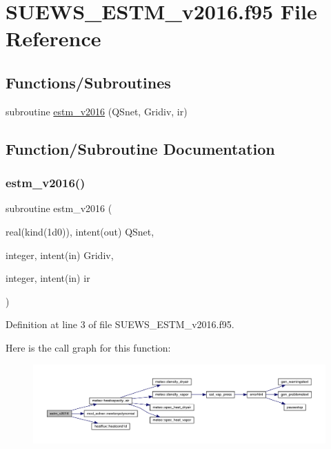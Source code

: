 \hypertarget{_s_u_e_w_s___e_s_t_m__v2016_8f95}{}\section{S\+U\+E\+W\+S\+\_\+\+E\+S\+T\+M\+\_\+v2016.\+f95 File Reference}
\label{_s_u_e_w_s___e_s_t_m__v2016_8f95}
\subsection*{Functions/\+Subroutines}
\begin{DoxyCompactItemize}
\item 
subroutine \hyperlink{_s_u_e_w_s___e_s_t_m__v2016_8f95_a76f075c3b84d1ab8aac9844ba11dbd3e}{estm\+\_\+v2016} (Q\+Snet, Gridiv, ir)
\end{DoxyCompactItemize}


\subsection{Function/\+Subroutine Documentation}
\mbox{\label{_s_u_e_w_s___e_s_t_m__v2016_8f95_a76f075c3b84d1ab8aac9844ba11dbd3e}} 
\subsubsection{\texorpdfstring{estm\+\_\+v2016()}{estm\_v2016()}}
{\footnotesize\ttfamily subroutine estm\+\_\+v2016 (\begin{DoxyParamCaption}\item[{real(kind(1d0)), intent(out)}]{Q\+Snet,  }\item[{integer, intent(in)}]{Gridiv,  }\item[{integer, intent(in)}]{ir }\end{DoxyParamCaption})}



Definition at line 3 of file S\+U\+E\+W\+S\+\_\+\+E\+S\+T\+M\+\_\+v2016.\+f95.

Here is the call graph for this function\+:\nopagebreak
\begin{figure}[H]
\begin{center}
\leavevmode
\includegraphics[width=350pt]{_s_u_e_w_s___e_s_t_m__v2016_8f95_a76f075c3b84d1ab8aac9844ba11dbd3e_cgraph}
\end{center}
\end{figure}
